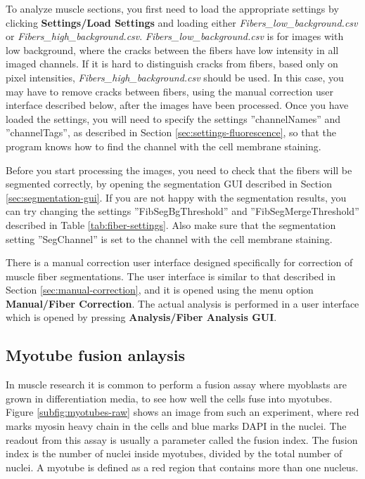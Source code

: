 \documentclass[a4paper, oneside, onecolumn, 11pt]{article}
\newcommand{\menu}[1]{\textbf{#1}}
\newcommand{\file}[1]{\emph{#1}}
\newcommand{\setting}[1]{''#1''}
\begin{document}
To analyze muscle sections, you first need to load the appropriate settings by clicking \menu{Settings/\allowbreak Load Settings} and loading either \file{Fibers\_\allowbreak low\_\allowbreak background.csv} or \file{Fibers\_\allowbreak high\_\allowbreak background.csv}. \file{Fibers\_\allowbreak low\_\allowbreak background.csv} is for images with low background, where the cracks between the fibers have low intensity in all imaged channels. If it is hard to distinguish cracks from fibers, based only on pixel intensities, \file{Fibers\_\allowbreak high\_\allowbreak background.csv} should be used. In this case, you may have to remove cracks between fibers, using the manual correction user interface described below, after the images have been processed. Once you have loaded the settings, you will need to specify the settings \setting{channelNames} and \setting{channelTags}, as described in Section \ref{sec:settings-fluorescence}, so that the program knows how to find the channel with the cell membrane staining.

Before you start processing the images, you need to check that the fibers will be segmented correctly, by opening the segmentation GUI described in Section \ref{sec:segmentation-gui}. If you are not happy with the segmentation results, you can try changing the settings \setting{FibSegBgThreshold} and \setting{FibSegMergeThreshold} described in Table \ref{tab:fiber-settings}. Also make sure that the segmentation setting \setting{SegChannel} is set to the channel with the cell membrane staining.

There is a manual correction user interface designed specifically for correction of muscle fiber segmentations. The user interface is similar to that described in Section \ref{sec:manual-correction}, and it is opened using the menu option \menu{Manual/\allowbreak Fiber Correction}. The actual analysis is performed in a user interface which is opened by pressing \menu{Analysis/\allowbreak Fiber Analysis GUI}.

\subsection{Myotube fusion anlaysis}
\label{sec:fusion}
In muscle research it is common to perform a fusion assay where myoblasts are grown in differentiation media, to see how well the cells fuse into myotubes. Figure \ref{subfig:myotubes-raw} shows an image from such an experiment, where red marks myosin heavy chain in the cells and blue marks DAPI in the nuclei. The readout from this assay is usually a parameter called the fusion index. The fusion index is the number of nuclei inside myotubes, divided by the total number of nuclei. A myotube is defined as a red region that contains more than one nucleus.
\end{document}
